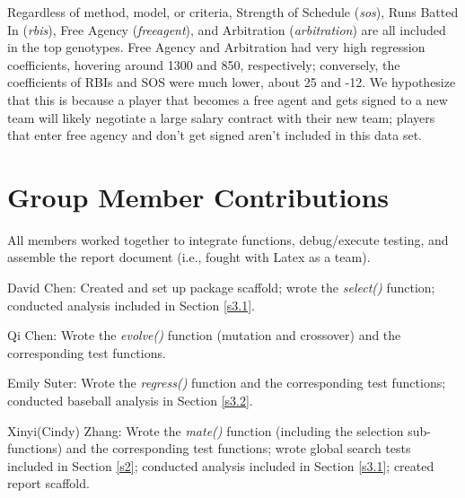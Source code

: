 \documentclass{article}
\begin{document}
Regardless of method, model, or criteria, Strength of Schedule (\textit{sos}), Runs Batted In (\textit{rbis}), Free Agency (\textit{freeagent}), and Arbitration (\textit{arbitration}) are all included in the top genotypes.  Free Agency and Arbitration had very high regression coefficients, hovering around 1300 and 850, respectively; conversely, the coefficients of RBIs and SOS were much lower, about 25 and -12.  We hypothesize that this is because a player that becomes a free agent and gets signed to a new team will likely negotiate a large salary contract with their new team;  players that enter free agency and don't get signed aren't included in this data set.


\section{Group Member Contributions}\label{s4}
All members worked together to integrate functions, debug/execute testing, and assemble the report document (i.e., fought with Latex as a team).

\vspace{3mm}
\noindent
David Chen: Created and set up package scaffold; wrote the \textit{select()} function; conducted analysis included in Section \ref{s3.1}.

\vspace{3mm}
\noindent
Qi Chen: Wrote the \textit{evolve()} function (mutation and crossover) and the corresponding test functions.

\vspace{3mm}
\noindent
Emily Suter:  Wrote the \textit{regress()} function and the corresponding test functions; conducted baseball analysis in Section \ref{s3.2}.

\vspace{3mm}
\noindent
Xinyi(Cindy) Zhang: Wrote the \textit{mate()} function (including the selection sub-functions) and the corresponding test functions; wrote global search tests included in Section \ref{s2}; conducted analysis included in Section \ref{s3.1}; created report scaffold.



\nocite{selection}


\end{document}
